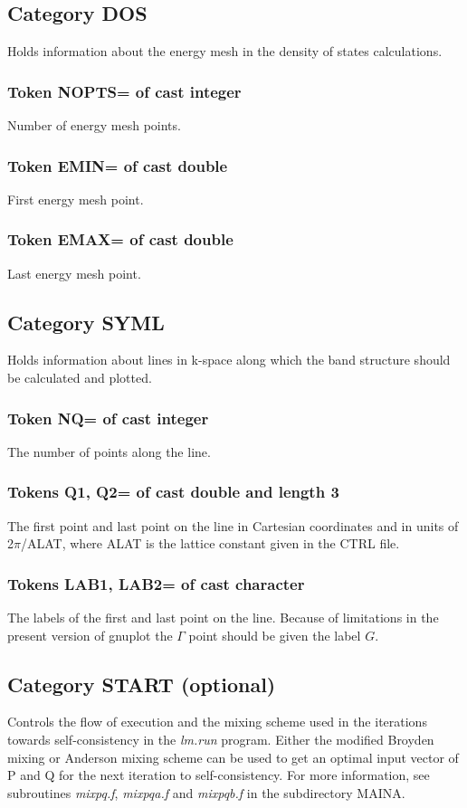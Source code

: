 \documentclass[aps,twocolumn,a4]{revtex4}
\begin{document}
\subsection{Category DOS}
Holds information about the energy mesh in the density of
states calculations.

\subsubsection{Token NOPTS= of cast integer}
Number of energy mesh points.

\subsubsection{Token EMIN= of cast double}
First energy mesh point.

\subsubsection{Token EMAX= of cast double}
Last energy mesh point.

\subsection{Category SYML}
Holds information about lines in k-space along which the
band structure should be calculated and plotted.

\subsubsection{Token NQ= of cast integer}
The number of points along the line.

\subsubsection{Tokens Q1, Q2= of cast double and length 3}
The first point and last point on
the line in Cartesian coordinates and in units of
2$\pi $/ALAT, where ALAT is the lattice constant given in the CTRL
file.

\subsubsection{Tokens LAB1, LAB2= of cast character}
The labels of the first and last point on the line. Because of
limitations in the present version of gnuplot the $\Gamma $ point
should be given the label $G$.

\subsection{Category START (optional)}
Controls the flow of execution and the mixing scheme used
in the iterations towards self-consistency in the
{\em lm.run} program.  Either
the modified Broyden mixing or Anderson mixing scheme can be used to get
an optimal input vector of P and Q for the next iteration to
self-consistency.  For more information, see subroutines {\em mixpq.f},
{\em mixpqa.f} and {\em mixpqb.f} in the subdirectory MAINA.
\end{document}
